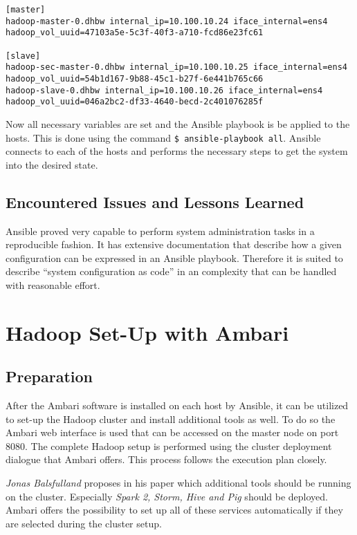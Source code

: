 \lstset{language=sh}
\begin{lstlisting}[caption={Exemplary inventory description in Ansible}, label={lst:inventory}]
[master]
hadoop-master-0.dhbw internal_ip=10.100.10.24 iface_internal=ens4 hadoop_vol_uuid=47103a5e-5c3f-40f3-a710-fcd86e23fc61

[slave]
hadoop-sec-master-0.dhbw internal_ip=10.100.10.25 iface_internal=ens4 hadoop_vol_uuid=54b1d167-9b88-45c1-b27f-6e441b765c66
hadoop-slave-0.dhbw internal_ip=10.100.10.26 iface_internal=ens4 hadoop_vol_uuid=046a2bc2-df33-4640-becd-2c401076285f
\end{lstlisting}

Now all necessary variables are set and the Ansible playbook is be applied to the hosts.
This is done using the command \texttt{\$ ansible-playbook all}.
Ansible connects to each of the hosts and performs the necessary steps to get the system into the desired state.

\subsection{Encountered Issues and Lessons Learned}

Ansible proved very capable to perform system administration tasks in a reproducible fashion. 
It has extensive documentation that describe how a given configuration can be expressed in an Ansible playbook. 
Therefore it is suited to describe \enquote{system configuration as code} in an complexity that can be handled with reasonable effort.

\section{Hadoop Set-Up with Ambari}

\subsection{Preparation}

After the Ambari software is installed on each host by Ansible, it can be utilized to set-up the Hadoop cluster and install additional tools as well.
To do so the Ambari web interface is used that can be accessed on the master node on port 8080. The complete Hadoop setup is performed using the cluster deployment dialogue that Ambari offers. This process follows the execution plan closely.

\emph{Jonas Balsfulland} proposes in his paper which additional tools should be running on the cluster. Especially \emph{Spark 2, Storm, Hive and Pig} should be deployed.
Ambari offers the possibility to set up all of these services automatically if they are selected during the cluster setup.

